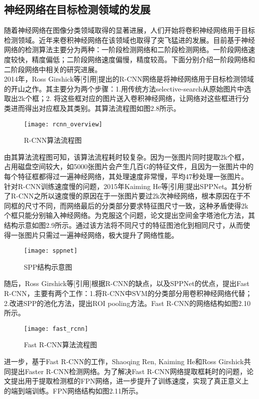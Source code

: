 \subsection{神经网络在目标检测领域的发展}
随着神经网络在图像分类领域取得的显著进展，人们开始将卷积神经网络用于目标检测领域。近年来卷积神经网络在该领域也取得了突飞猛进的发展。目前基于神经网络的检测算法主要分为两种：一阶段检测网络和二阶段检测网络。一阶段网络速度较快，精度偏低；二阶段网络速度偏慢，精度较高。下面分别介绍一阶段网络和二阶段网络中相关的研究进展。\\
2014年，Ross Girshick等[引用]提出的R-CNN网络是将神经网络用于目标检测领域的开山之作。其主要分为两个步骤：1.用传统方法selective-search从原始图片中选取出2k个框；2. 将这些框对应的图片送入卷积神经网络，让网络对这些框进行分类进而得出对应框及其类别。其算法流程图如图2.8所示。\\
\begin{figure}[htp]
\centering
\texttt{[image: rcnn\_overview]}
\caption{R-CNN算法流程图}
\end{figure}
由其算法流程图可知，该算法流程耗时较复杂。因为一张图片同时提取2k个框，占用磁盘空间较大，如5000张图片会产生几百G的特征文件，且因为一张图片中的每个特征框都得过一遍神经网络，其处理速度非常慢，平均47秒处理一张图片。\\
针对R-CNN训练速度慢的问题，2015年Kaiming He等[引用]提出SPPNet。其分析了R-CNN之所以速度慢的原因在于一张图片要过2k次神经网络，根本原因在于不同框的尺寸不同，而网络最后的分类部分要求特征图尺寸一致，这种矛盾使得2k个框只能分别输入神经网络。为克服这个问题，论文提出空间金字塔池化方法，其结构示意如图2.9所示。通过该方法将不同尺寸的特征图池化到相同尺寸，从而使得一张图片只需过一遍神经网络，极大提升了网络性能。\\
\begin{figure}[htp]
\centering
\texttt{[image: sppnet]}
\caption{SPP结构示意图}
\end{figure}
随后，Ross Girshick等[引用]根据R-CNN的缺点，以及SPPNet的优点，提出Fast R-CNN，主要有两个工作：1.将R-CNN中SVM的分类部分用卷积神经网络代替；2.改进SPP的池化方法，提出ROI pooling方法。Fast R-CNN的网络结构如图2.10所示。\\
\begin{figure}[htp]
\centering
\texttt{[image: fast\_rcnn]}
\caption{Fast R-CNN算法流程图}
\end{figure}
进一步，基于Fast R-CNN的工作，Shaoqing Ren, Kaiming He和Ross Girshick共同提出Faster R-CNN检测网络。为了解决Fast R-CNN网络提取框耗时的问题，论文提出用于提取检测框的FPN网络，进一步提升了训练速度，实现了真正意义上的端到端训练。FPN网络结构如图2.11所示。\\
